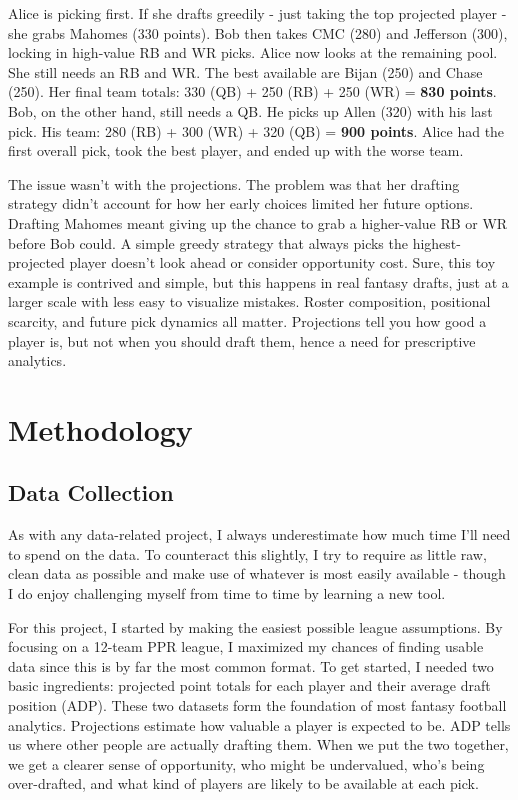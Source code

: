 \documentclass{article}
\begin{document}
Alice is picking first. If she drafts greedily - just taking the top projected player - she grabs Mahomes (330 points).
Bob then takes CMC (280) and Jefferson (300), locking in high-value RB and WR picks.
Alice now looks at the remaining pool. She still needs an RB and WR.
The best available are Bijan (250) and Chase (250). Her final team totals: 330 (QB) + 250 (RB) + 250 (WR) = \textbf{830 points}.
Bob, on the other hand, still needs a QB. He picks up Allen (320) with his last pick. His team: 280 (RB) + 300 (WR) + 320 (QB) = \textbf{900 points}.
Alice had the first overall pick, took the best player, and ended up with the worse team.

The issue wasn't with the projections. The problem was that her drafting strategy didn't account for how her early choices limited her future options.
Drafting Mahomes meant giving up the chance to grab a higher-value RB or WR before Bob could.
A simple greedy strategy that always picks the highest-projected player doesn't look ahead or consider opportunity cost.
Sure, this toy example is contrived and simple, but this happens in real fantasy drafts, just at a larger scale with less easy to visualize mistakes.
Roster composition, positional scarcity, and future pick dynamics all matter.
Projections tell you how good a player is, but not when you should draft them, hence a need for prescriptive analytics.

\section{Methodology}
\subsection{Data Collection}
As with any data-related project, I always underestimate how much time I'll need to spend on the data.
To counteract this slightly, I try to require as little raw, clean data as possible and make use of whatever is most easily available - though I do enjoy challenging myself from time to time by learning a new tool.

For this project, I started by making the easiest possible league assumptions.
By focusing on a 12-team PPR league, I maximized my chances of finding usable data since this is by far the most common format.
To get started, I needed two basic ingredients: projected point totals for each player and their average draft position (ADP).
These two datasets form the foundation of most fantasy football analytics.
Projections estimate how valuable a player is expected to be. ADP tells us where other people are actually drafting them.
When we put the two together, we get a clearer sense of opportunity, who might be undervalued, who's being over-drafted, and what kind of players are likely to be available at each pick.
\end{document}
